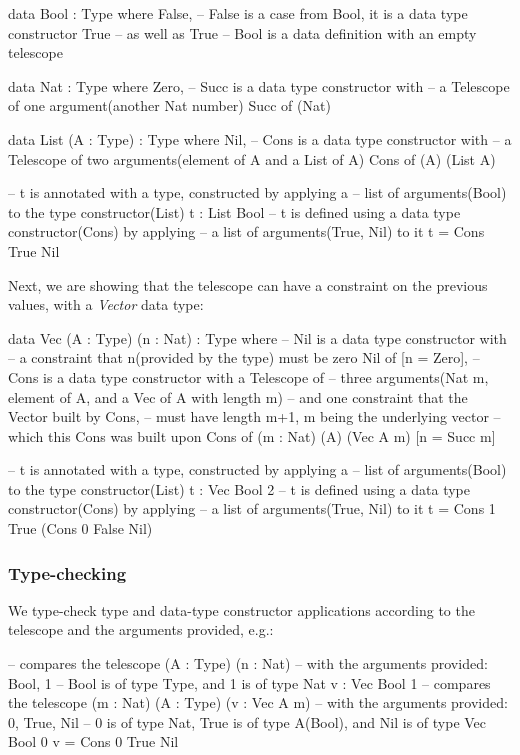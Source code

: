 \begin{piforall}
data Bool : Type where {
       False,  -- False is a case from Bool, it is a data type constructor
       True    -- as well as True
} -- Bool is a data definition with an empty telescope

data Nat : Type where {
       Zero,
       -- Succ is a data type constructor with
       -- a Telescope of one argument(another Nat number)
       Succ of (Nat)
}

data List (A : Type) : Type where {
       Nil,
       -- Cons is a data type constructor with
       -- a Telescope of two arguments(element of A and a List of A)
       Cons of (A) (List A)
}

-- t is annotated with a type, constructed by applying a
-- list of arguments(Bool) to the type constructor(List)
t : List Bool
-- t is defined using a data type constructor(Cons) by applying
-- a list of arguments(True, Nil) to it
t = Cons True Nil
\end{piforall}

Next, we are showing that the telescope can have a constraint on the previous values, with a \emph{Vector} data type:

\begin{piforall}
data Vec (A : Type) (n : Nat) : Type where {
  -- Nil is a data type constructor with
  -- a constraint that n(provided by the type) must be zero
  Nil of [n = Zero],
  -- Cons is a data type constructor with a Telescope of 
  -- three arguments(Nat m, element of A, and a Vec of A with length m)
  -- and one constraint that the Vector built by Cons,
  -- must have length m+1, m being the underlying vector
  -- which this Cons was built upon
  Cons of (m : Nat) (A) (Vec A m) [n = Succ m]
}

-- t is annotated with a type, constructed by applying a
-- list of arguments(Bool) to the type constructor(List)
t : Vec Bool 2
-- t is defined using a data type constructor(Cons) by applying
-- a list of arguments(True, Nil) to it
t = Cons 1 True (Cons 0 False Nil)
\end{piforall}

\subsubsection{Type-checking}

We type-check type and data-type constructor applications according to the telescope and the arguments provided, e.g.:

\begin{piforall}
-- compares the telescope (A : Type) (n : Nat)
-- with the arguments provided: Bool, 1
-- Bool is of type Type, and 1 is of type Nat
v : Vec Bool 1
-- compares the telescope (m : Nat) (A : Type) (v : Vec A m)
-- with the arguments provided: 0, True, Nil
-- 0 is of type Nat, True is of type A(Bool), and Nil is of type Vec Bool 0
v = Cons 0 True Nil
\end{piforall}

